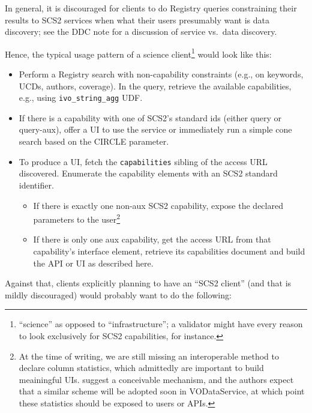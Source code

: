 \documentclass[11pt,a4paper]{ivoa}
\begin{document}
In general, it is discouraged for clients to do Registry queries
constraining their results to SCS2 services
when what their users presumably want is
data discovery; see the DDC note \citep{2019ivoa.spec.0520D} for a
discussion of service vs.~data discovery.

Hence, the typical usage pattern of a science
client\footnote{``science'' as opposed to ``infrastructure''; a
validator might have every reason to look exclusively for SCS2
capabilities, for instance.} would look like this:

\begin{itemize}
\item Perform a Registry search with non-capability constraints (e.g.,
on keywords, UCDs, authors, coverage).  In the query, retrieve the available
capabilities, e.g., using \verb|ivo_string_agg| UDF.

\item If there is a capability with one of SCS2's standard ids (either
query or query-aux), offer a UI to use the service or immediately run a
simple cone search based on the CIRCLE parameter.

\item To produce a UI, fetch the \texttt{capabilities} sibling of the
access URL discovered.  Enumerate the capability elements with an SCS2
standard identifier.

\begin{itemize}
\item If there is exactly one non-aux SCS2 capability, expose
the declared parameters to the user\footnote{At the time of writing, we
are still missing an interoperable method to declare column statistics,
which admittedly are important to build meainingful UIs.
\citet{note:colstatnote} suggest a conceivable mechanism, and the
authors expect that a similar scheme will be adopted soon in
VODataService, at which point these statistics should be exposed to
users or APIs.}

\item If there is only one aux capability, get the access URL from that
capability's interface element, retrieve its capabilities document and
build the API or UI as described here.
\end{itemize}
\end{itemize}

Against that, clients explicitly planning to have an ``SCS2 client''
(and that is mildly discouraged) would probably want to do the
following:
\end{document}
